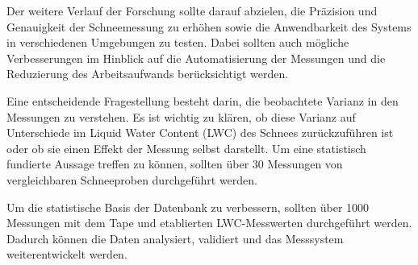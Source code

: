 Der weitere Verlauf der Forschung sollte darauf abzielen, die Präzision und Genauigkeit der Schneemessung zu erhöhen sowie die Anwendbarkeit des Systems in verschiedenen Umgebungen zu testen. Dabei sollten auch mögliche Verbesserungen im Hinblick auf die Automatisierung der Messungen und die Reduzierung des Arbeitsaufwands berücksichtigt werden.

Eine entscheidende Fragestellung besteht darin, die beobachtete Varianz in den Messungen zu verstehen. Es ist wichtig zu klären, ob diese Varianz auf Unterschiede im Liquid Water Content (LWC) des Schnees zurückzuführen ist oder ob sie einen Effekt der Messung selbst darstellt. Um eine statistisch fundierte Aussage treffen zu können, sollten über 30 Messungen von vergleichbaren Schneeproben durchgeführt werden.

Um die statistische Basis der Datenbank zu verbessern, sollten über 1000 Messungen mit dem Tape und etablierten LWC-Messwerten durchgeführt werden. Dadurch können die Daten analysiert, validiert und das Messsystem weiterentwickelt werden.
